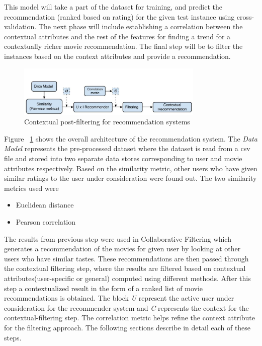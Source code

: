 \documentclass{article}
\begin{document}
This model will take a part of the dataset for training, and predict the recommendation (ranked based on rating) for the given test instance using cross-validation. The next phase will include establishing a correlation between the contextual attributes and the rest of the features for finding a trend for a contextually richer movie recommendation. The final step will be to filter the instances based on the context attributes and provide a recommendation. 

\begin{figure}[H]
\centering
\includegraphics[width=3.5in]{archdiagram.jpg}
\caption{Contextual post-filtering for recommendation systems}
\label{archdiag}
\end{figure}

Figure ~\ref{archdiag} shows the overall architecture of the recommendation system. The \textit{Data Model} represents the pre-processed dataset where the dataset is read from a csv file and stored into two separate data stores corresponding to user and movie attributes respectively. Based on the similarity metric, other users who have given similar ratings to the user under consideration were found out.     The two similarity metrics used were

\begin{itemize}
\item Euclidean distance 
\item Pearson correlation
\end{itemize}


The results from previous step were used in Collaborative Filtering which generates a recommendation of the movies for given user by looking at other users who have similar tastes. These recommendations are then passed through the contextual filtering step, where the results are filtered based on contextual attributes(user-specific or general) computed using different methods. After this step a contextualized result in the form of a ranked list of movie recommendations is obtained. The block \textit{U} represent the active user under consideration for the recommender system and \textit{C} represents the context for the contextual-filtering step. The correlation metric helps refine the context attribute for the filtering approach. The following sections describe in detail each of these steps.
\end{document}
